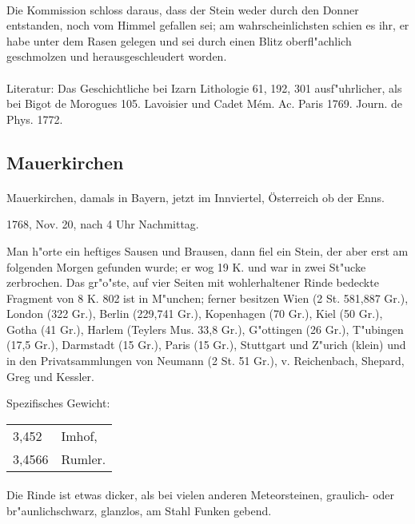 \documentclass[a4paper, 11pt, oneside]{article}
\begin{document}
\paragraph{}
Die Kommission schloss daraus, dass der Stein weder durch den Donner entstanden, noch vom Himmel gefallen sei; am wahrscheinlichsten schien es ihr, er habe unter dem Rasen gelegen und sei durch einen Blitz oberfl"achlich geschmolzen und herausgeschleudert worden.
\footnotesize
\paragraph{}
Literatur: Das Geschichtliche bei Izarn Lithologie 61, 192, 301 ausf"uhrlicher, als bei Bigot de Morogues 105. Lavoisier und Cadet Mém. Ac. Paris 1769. Journ. de Phys. 1772.
\subsection{Mauerkirchen}
\normalsize
\paragraph{}
Mauerkirchen, damals in Bayern, jetzt im Innviertel, Österreich ob der Enns.

1768, Nov. 20, nach 4 Uhr Nachmittag.

Man h"orte ein heftiges Sausen und Brausen, dann fiel ein Stein, der aber erst am folgenden Morgen gefunden wurde; er wog 19 K. und war in zwei St"ucke zerbrochen. Das gr"o"ste, auf vier Seiten mit wohlerhaltener Rinde bedeckte Fragment von 8 K. 802 ist in M"unchen; ferner besitzen Wien (2 St. 581,887 Gr.), London (322 Gr.), Berlin (229,741 Gr.), Kopenhagen (70 Gr.), Kiel (50 Gr.), Gotha (41 Gr.), Harlem (Teylers Mus. 33,8 Gr.), G"ottingen (26 Gr.), T"ubingen (17,5 Gr.), Darmstadt (15 Gr.), Paris (15 Gr.), Stuttgart und Z"urich (klein) und in den Privatsammlungen von Neumann (2 St. 51 Gr.), v. Reichenbach, Shepard, Greg und Kessler.

Spezifisches Gewicht:
\begin{table}[!ht]
    \centering
    \begin{tabular}{l l}
        3,452 & Imhof,\\
        3,4566 & Rumler.
    \end{tabular}
\end{table}
\paragraph{}
Die Rinde ist etwas dicker, als bei vielen anderen Meteorsteinen, graulich- oder br"aunlichschwarz, glanzlos, am Stahl Funken gebend.
\end{document}
